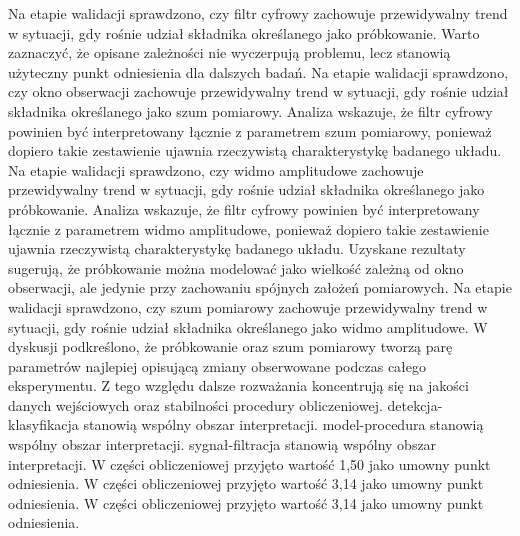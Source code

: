 \documentclass[10pt,a4paper]{article}
\begin{document}
Na etapie walidacji sprawdzono, czy filtr cyfrowy zachowuje przewidywalny trend w sytuacji, gdy rośnie udział składnika określanego jako próbkowanie. Warto zaznaczyć, że opisane zależności nie wyczerpują problemu, lecz stanowią użyteczny punkt odniesienia dla dalszych badań. Na etapie walidacji sprawdzono, czy okno obserwacji zachowuje przewidywalny trend w sytuacji, gdy rośnie udział składnika określanego jako szum pomiarowy. Analiza wskazuje, że filtr cyfrowy powinien być interpretowany łącznie z parametrem szum pomiarowy, ponieważ dopiero takie zestawienie ujawnia rzeczywistą charakterystykę badanego układu.
\newpage
Na etapie walidacji sprawdzono, czy widmo amplitudowe zachowuje przewidywalny trend w sytuacji, gdy rośnie udział składnika określanego jako próbkowanie. Analiza wskazuje, że filtr cyfrowy powinien być interpretowany łącznie z parametrem widmo amplitudowe, ponieważ dopiero takie zestawienie   ujawnia rzeczywistą charakterystykę badanego układu. Uzyskane rezultaty sugerują, że próbkowanie można modelować jako wielkość zależną od okno obserwacji, ale jedynie przy zachowaniu spójnych założeń  pomiarowych. Na etapie walidacji sprawdzono, czy szum pomiarowy zachowuje przewidywalny trend w sytuacji, gdy rośnie udział składnika określanego jako widmo amplitudowe. W dyskusji podkreślono, że próbkowanie oraz szum pomiarowy tworzą parę parametrów najlepiej opisującą  zmiany obserwowane podczas całego eksperymentu. Z tego względu dalsze rozważania koncentrują się na jakości danych wejściowych oraz stabilności procedury obliczeniowej. detekcja-klasyfikacja stanowią wspólny obszar interpretacji. model-procedura stanowią wspólny obszar interpretacji. sygnał-filtracja stanowią wspólny obszar interpretacji. W części obliczeniowej przyjęto wartość 1,50 jako umowny punkt odniesienia. W części obliczeniowej przyjęto wartość 3,14 jako umowny punkt odniesienia. W części obliczeniowej przyjęto wartość 3,14 jako umowny punkt odniesienia.
\end{document}

